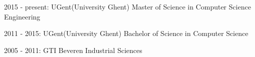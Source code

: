 


\begin{cventries}


\cventry
{2015 - present: UGent(University Ghent)} %
{Master of Science in Computer Science Engineering} %
{}
{}
{ %
}

\cventry
{2011 - 2015: UGent(University Ghent)} %
{Bachelor of Science in Computer Science} %
{}
{}
{ %
}

\cventry
{2005 - 2011: GTI Beveren} %
{Industrial Sciences} %
{}
{}
{ %
}


\end{cventries}